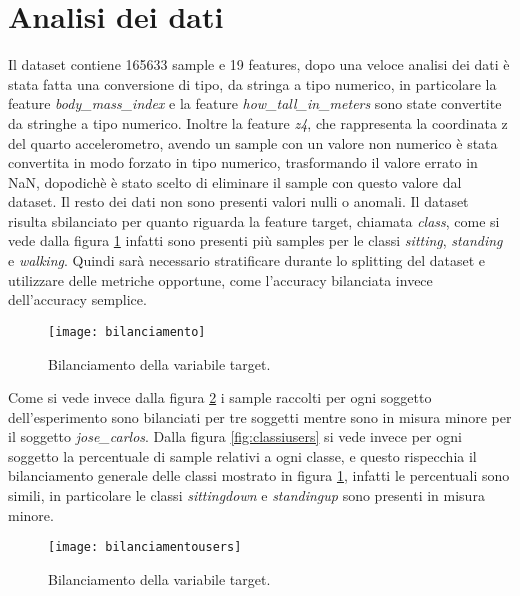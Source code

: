 \section{Analisi dei dati}\label{sec:analisi}

Il dataset \cite{dataset_article} contiene 165633 sample e 19 features, dopo una veloce analisi dei dati è stata fatta una conversione di tipo, da stringa a tipo numerico, in particolare la feature \textit{body\_mass\_index} e la feature \textit{how\_tall\_in\_meters} sono state convertite da stringhe a tipo numerico. Inoltre la feature \textit{z4}, che rappresenta la coordinata z del quarto accelerometro, avendo un sample con un valore non numerico è stata convertita in modo forzato in tipo numerico, trasformando il valore errato in NaN, dopodichè è stato scelto di eliminare il sample con questo valore dal dataset.  Il resto dei dati non sono presenti valori nulli o anomali.
Il dataset risulta sbilanciato per quanto riguarda la feature target, chiamata \textit{class}, come si vede dalla figura \ref{fig:bilanciamento} infatti sono presenti più samples per le classi \textit{sitting}, \textit{standing} e \textit{walking}. Quindi sarà necessario stratificare durante lo splitting del dataset e utilizzare delle metriche opportune, come l'accuracy bilanciata invece dell'accuracy semplice.

\begin{figure}[h]
    \centering\texttt{[image: bilanciamento]}
    \caption{Bilanciamento della variabile target.}
    \label{fig:bilanciamento}
\end{figure}

Come si vede invece dalla figura \ref{fig:bilanciamentousers} i sample raccolti per ogni soggetto dell'esperimento sono bilanciati per tre soggetti mentre sono in misura minore per il soggetto \textit{jose\_carlos}. Dalla figura \ref{fig:classiusers} si vede invece per ogni soggetto la percentuale di sample relativi a ogni classe, e questo rispecchia il bilanciamento generale delle classi mostrato in figura \ref{fig:bilanciamento}, infatti le percentuali sono simili, in particolare le classi \textit{sittingdown} e \textit{standingup} sono presenti in misura minore.

\begin{figure}[h]
    \centering\texttt{[image: bilanciamentousers]}
    \caption{Bilanciamento della variabile target.}
    \label{fig:bilanciamentousers}
\end{figure}

